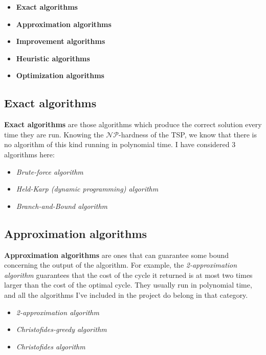\documentclass[12pt,twoside,notitlepage]{report}
\begin{document}
\begin{itemize}

\item {\bf Exact algorithms}
\item {\bf Approximation algorithms}
\item {\bf Improvement algorithms}
\item {\bf Heuristic algorithms}
\item {\bf Optimization algorithms} 
\end{itemize}

\subsection{Exact algorithms}

{\bf Exact algorithms} are those algorithms which produce the correct solution every time they are run. Knowing the $\mathcal{NP}$-hardness of the TSP, we know that there is no algorithm of this kind running in polynomial time. I have considered 3 algorithms here:

\begin{itemize}

\item {\it Brute-force algorithm}
\item {\it Held-Karp (dynamic programming) algorithm}
\item {\it Branch-and-Bound algorithm}

\end{itemize}

\subsection{Approximation algorithms}

{\bf Approximation algorithms} are ones that can guarantee some bound concerning the output of the algorithm. For example, the {\it 2-approximation algorithm} guarantees that the cost of the cycle it returned is at most two times larger than the cost of the optimal cycle. They usually run in polynomial time, and all the algorithms I've included in the project do belong in that category.

\begin{itemize}

\item {\it 2-approximation algorithm}
\item {\it Christofides-greedy algorithm}
\item {\it Christofides algorithm}

\end{itemize}
\end{document}
